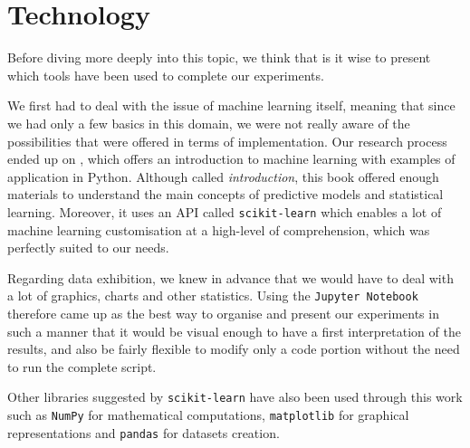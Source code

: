 \section{Technology}

Before diving more deeply into this topic, we think that is it wise to present which tools have been used to complete our experiments.

We first had to deal with the issue of machine learning itself, meaning that since we had only a few basics in this domain, we were not really aware of the possibilities that were offered in terms of implementation. Our research process ended up on \cite{ML}, which offers an introduction to machine learning with examples of application in Python. Although called \textit{introduction}, this book offered enough materials to understand the main concepts of predictive models and statistical learning. Moreover, it uses an API called \texttt{scikit-learn} \cite{scikit} which enables a lot of machine learning customisation at a high-level of comprehension, which was perfectly suited to our needs.

Regarding data exhibition, we knew in advance that we would have to deal with a lot of graphics, charts and other statistics. Using the \texttt{Jupyter Notebook} \cite{jupyter} therefore came up as the best way to organise and present our experiments in such a manner that it would be visual enough to have a first interpretation of the results, and also be fairly flexible to modify only a code portion without the need to run the complete script.

Other libraries suggested by \texttt{scikit-learn} have also been used through this work such as \texttt{NumPy} \cite{numpy} for mathematical computations, \texttt{matplotlib} \cite{matplotlib} for graphical representations and \texttt{pandas} \cite{pandas} for datasets creation.